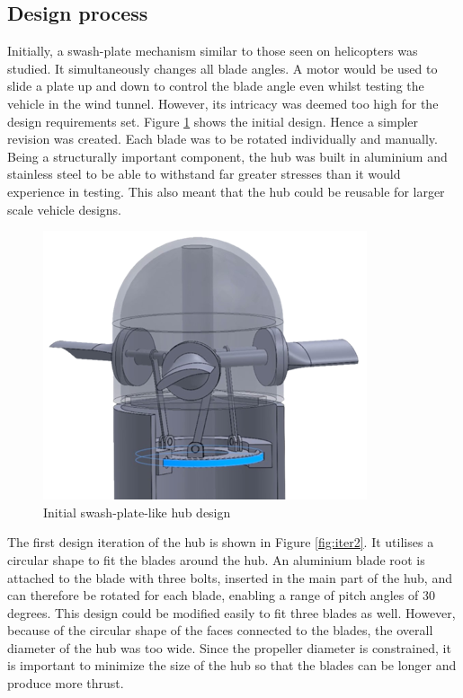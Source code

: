 \subsection{Design process}

Initially, a swash-plate mechanism similar to those seen on helicopters was studied. It simultaneously changes all blade angles. A motor would be used to slide a plate up and down to control the blade angle even whilst testing the vehicle in the wind tunnel. However, its intricacy was deemed too high for the design requirements set. Figure \ref{fig:swash} shows the initial design. Hence a simpler revision was created. Each blade was to be rotated individually and manually. Being a structurally important component, the hub was built in aluminium and stainless steel to be able to withstand far greater stresses than it would experience in testing. This also meant that the hub could be reusable for larger scale vehicle designs.

\begin{figure}[!htbp]
    \centering
    \includegraphics{images/part7/swash.png}
    \caption{Initial swash-plate-like hub design}
    \label{fig:swash}
\end{figure}

The first design iteration of the hub is shown in Figure \ref{fig:iter2}. It utilises a circular shape to fit the blades around the hub. An aluminium blade root is attached to the blade with three bolts, inserted in the main part of the hub, and can therefore be rotated for each blade, enabling a range of pitch angles of 30 degrees. This design could be modified easily to fit three blades as well. However, because of the circular shape of the faces connected to the blades, the overall diameter of the hub was too wide. Since the propeller diameter is constrained, it is important to minimize the size of the hub so that the blades can be longer and produce more thrust.

